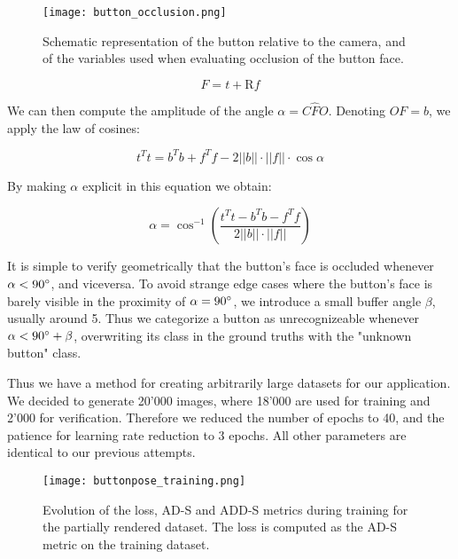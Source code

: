 \begin{figure}
    \texttt{[image: button\_occlusion.png]}
    \caption{Schematic representation of the button relative to the camera, and of the variables used when evaluating occlusion of the button face.}
    \label{fig:button_occlusion}
\end{figure}

\begin{equation*}
    F = t + \text{R}f
\end{equation*}

We can then compute the amplitude of the angle $\alpha = C\hat{F}O$. Denoting $OF=b$, we apply the law of cosines:

\begin{equation*}
    t^Tt = b^Tb + f^Tf -  2||b||\cdot ||f|| \cdot \cos \alpha
\end{equation*}

By making $\alpha$ explicit in this equation we obtain:

\begin{equation*}
    \alpha = \cos^{-1}\left(\frac{t^Tt- b^Tb-f^Tf}{2||b||\cdot||f||}\right)
\end{equation*}

It is simple to verify geometrically that the button's face is occluded whenever $\alpha < 90\degree$, and viceversa. To avoid strange edge cases where the button's face is barely visible in the proximity of $\alpha = 90\degree$, we introduce a small buffer angle $\beta$, usually around 5\degree. Thus we categorize a button as unrecognizeable whenever $\alpha < 90\degree + \beta$, overwriting its class in the ground truths with the "unknown button" class.

Thus we have a method for creating arbitrarily large datasets for our application. We decided to generate 20'000 images, where 18'000 are used for training and 2'000 for verification. Therefore we reduced the number of epochs to 40, and the patience for learning rate reduction to 3 epochs. All other parameters are identical to our previous attempts.

\begin{figure}
    \texttt{[image: buttonpose\_training.png]}
    \caption{Evolution of the loss, AD-S and ADD-S metrics during training for the partially rendered dataset. The loss is computed as the AD-S metric on the training dataset.}
    \label{fig:buttonpose_training}
\end{figure}

